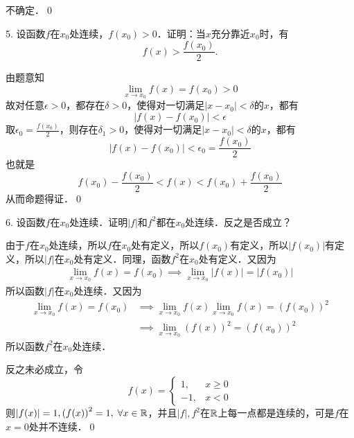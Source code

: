 \answer 不确定．\qed\bigskip

5. 设函数$f$在$x_0$处连续，$f(x_0) > 0$．证明：当$x$充分靠近$x_0$时，有
\begin{equation}
    f(x) > \frac{f(x_0)}{2}.
\end{equation}
\bigskip

\prove 由题意知
\begin{equation}
    \lim_{x \to x_0} f(x) = f(x_0) > 0
\end{equation}
故对任意$\epsilon > 0$，都存在$\delta > 0$，使得对一切满足$\lvert x - x_0 \rvert < \delta$的$x$，都有
\begin{equation}
    \lvert f(x) - f(x_0) \rvert < \epsilon
\end{equation}
取$\epsilon_0 = \displaystyle\frac{f(x_0)}{2}$，则存在$\delta_1 > 0$，使得对一切满足$\lvert x - x_0 \rvert < \delta$的$x$，都有
\begin{equation}
    \lvert f(x) - f(x_0) \rvert < \epsilon_0 = \frac{f(x_0)}{2}
\end{equation}
也就是
\begin{equation}
    f(x_0) - \frac{f(x_0)}{2} < f(x) < f(x_0) + \frac{f(x_0)}{2}
\end{equation}
从而命题得证．\qed\bigskip

6. 设函数$f$在$x_0$处连续．证明$\lvert f \rvert$和$f^2$都在$x_0$处连续．反之是否成立？
\bigskip

\prove 由于$f$在$x_0$处连续，所以$f$在$x_0$处有定义，所以$f(x_0)$有定义，所以$\lvert f(x_0) \rvert$有定义，所以$\lvert f \rvert$在$x_0$处有定义．同理，函数$f^2$在$x_0$处有定义．又因为
\begin{align}
    \lim_{x \to x_0} f(x) = f(x_0) \implies \lim_{x \to x_0} \lvert f(x) \rvert = \lvert f(x_0) \rvert
\end{align}
所以函数$\lvert f \rvert$在$x_0$处连续．又因为
\begin{align}
    \lim_{x \to x_0} f(x) = f(x_0) &\implies \lim_{x \to x_0} f(x) \lim_{x \to x_0} f(x) = (f(x_0))^2 \\
    &\implies \lim_{x \to x_0} \left(f(x)\right)^2 = \left(f(x_0)\right)^2
\end{align}
所以函数$f^2$在$x_0$处连续．

反之未必成立，令
\begin{equation}
    f(x) = \begin{cases}
        1, & x \geq 0 \\
        -1, & x < 0
    \end{cases}
\end{equation}
则$\lvert f(x) \rvert = 1, \left(f(x)\right)^2 = 1, \; \forall x \in \mathbb{R}$，并且$\lvert f \rvert, f^2$在$\mathbb{R}$上每一点都是连续的，可是$f$在$x=0$处并不连续．\qed\bigskip

